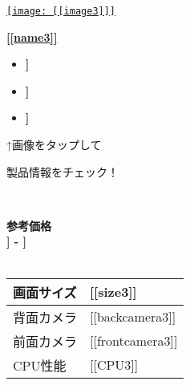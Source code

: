 \documentclass[lualatex,paper=a4,airticle]{jlreq}
\begin{document}
\newpage

\begin{minipage}[t][0.43\textheight][t]{\textwidth}
  \begin{minipage}{0.23\textwidth}
    \href{[[url3]]}{\texttt{[image: [[image3]]]}}
  \end{minipage}%
  \hfill
  \begin{minipage}{0.77\textwidth}
    \href{[[lurl3]]}{\huge{\textbf{[[name3]]}}}\par
    \begin{itemize}
      \item {\color{Purple}\mcfamily\bfseries\myfont [[description31]]}
      \item {\color{Purple}\mcfamily\bfseries\myfont [[description32]]}
      \item {\color{Purple}\mcfamily\bfseries\myfont [[description33]]}
    \end{itemize}
  \end{minipage}
  \vspace{-1\baselineskip}
  \begin{multicols}{2}
    \begin{spacing}{0.5}
      {\qquad↑画像をタップして \par \qquad 製品情報をチェック！}\\
    \end{spacing}
    {\color{red}\textbf{参考価格}}\\
    {\LARGE\color{red}\textbf{\textyen [[lprice3]] - \textyen [[hprice3]]}}\\
    \\
    \begin{minipage}{0.75\columnwidth}
      \begin{tabular}{l p{4.5cm}}
        \hline
        画面サイズ & [[size3]] \\
        \hline
        背面カメラ & [[backcamera3]] \\
        \hline
        前面カメラ & [[frontcamera3]] \\
        \hline
        CPU性能 & [[CPU3]] \\
        \hline
      \end{tabular}
    \end{minipage}
    \columnbreak


\end{multicols}
\end{minipage}
\end{document}
